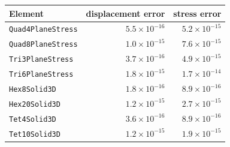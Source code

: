 \begin{tabular}{lrr}
\toprule
Element & displacement error & stress error \\
\midrule
\texttt{Quad4PlaneStress} & $5.5\times10^{-16}$ & $5.2\times10^{-15}$ \\
\texttt{Quad8PlaneStress} & $1.0\times10^{-15}$ & $7.6\times10^{-15}$ \\
\texttt{Tri3PlaneStress} & $3.7\times10^{-16}$ & $4.9\times10^{-15}$ \\
\texttt{Tri6PlaneStress} & $1.8\times10^{-15}$ & $1.7\times10^{-14}$ \\
\texttt{Hex8Solid3D} & $1.8\times10^{-16}$ & $8.9\times10^{-16}$ \\
\texttt{Hex20Solid3D} & $1.2\times10^{-15}$ & $2.7\times10^{-15}$ \\
\texttt{Tet4Solid3D} & $3.6\times10^{-16}$ & $8.9\times10^{-16}$ \\
\texttt{Tet10Solid3D} & $1.2\times10^{-15}$ & $1.9\times10^{-15}$ \\
\bottomrule
\end{tabular}
